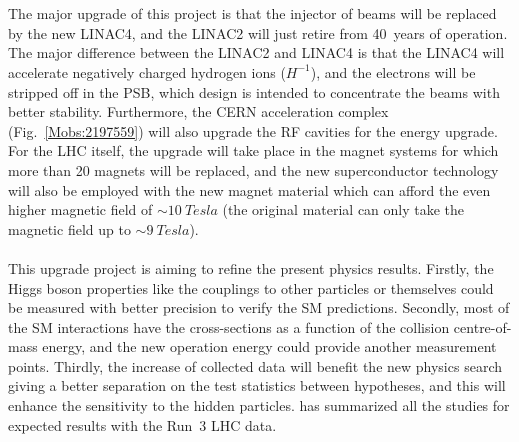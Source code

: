 \noindent
\\
\\The major upgrade of this project is that the injector of beams will be replaced by the new LINAC4, and the LINAC2 will just retire from 40~years of operation. The major difference between the LINAC2 and LINAC4 is that the LINAC4 will accelerate negatively charged hydrogen ions ($H^{-1}$), and the electrons will be stripped off in the PSB, which design is intended to concentrate the beams with better stability\cite{LINAC4}. Furthermore, the CERN acceleration complex (Fig.~\ref{Mobs:2197559}) will also upgrade the RF cavities for the energy upgrade. For the LHC itself, the upgrade will take place in the magnet systems for which more than 20 magnets will be replaced, and the new superconductor technology will also be employed with the new magnet material which can afford the even higher magnetic field of $\sim 10~Tesla$ (the original material can only take the magnetic field up to $\sim 9~Tesla$). 
\\
\\This upgrade project is aiming to refine the present physics results. Firstly, the Higgs boson properties like the couplings to other particles or themselves could be measured with better precision to verify the SM predictions. Secondly, most of the SM interactions have the cross-sections as a function of the collision centre-of-mass energy, and the new operation energy could provide another measurement points. Thirdly, the increase of collected data will benefit the new physics search giving a better separation on the test statistics between hypotheses, and this will enhance the sensitivity to the hidden particles. \cite{Atlas:2019qfx} has summarized all the studies for expected results with the Run~3 LHC data.
